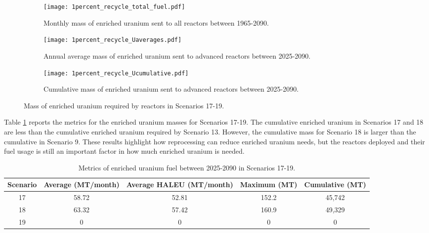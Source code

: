 \begin{figure}[h!]
    \centering
    \begin{subfigure}[b]{0.45\textwidth}
        \centering
        \texttt{[image: 1percent\_recycle\_total\_fuel.pdf]}
        \caption{Monthly mass of enriched uranium sent to all reactors 
        between 1965-2090.}
        \label{fig:1percent_recycle_all_uranium}
    \end{subfigure}
    \hfill
    \begin{subfigure}[b]{0.45\textwidth}
        \centering
        \texttt{[image: 1percent\_recycle\_Uaverages.pdf]}
        \caption{Annual average mass of enriched uranium sent to 
        advanced reactors between 2025-2090.}
        \label{fig:1percent_recycle_AR_uranium}
    \end{subfigure}
    \begin{subfigure}[b]{0.45\textwidth}
        \centering
        \texttt{[image: 1percent\_recycle\_Ucumulative.pdf]}
        \caption{Cumulative mass of enriched 
        uranium sent to advanced reactors between 2025-2090.}
        \label{fig:1percent_recycle_uranium_cumulative}
    \end{subfigure}
       \caption{Mass of enriched uranium required by reactors
        in Scenarios 17-19.}
       \label{fig:1percent_recycle_uranium}
\end{figure}

Table \ref{tab:s17-19_enrichedU} reports the metrics for the enriched 
uranium masses for Scenarios 17-19. The cumulative enriched 
uranium in Scenarios 17 and 18 are less than the cumulative 
enriched uranium required by Scenario 13. However, the cumulative 
mass for Scenario 18 is larger than the cumulative in Scenario 
9. These results highlight how reprocessing can reduce enriched 
uranium needs, but the reactors deployed and their fuel usage 
is still an important factor in how much enriched uranium is 
needed. 

\begin{table}[h!]
    \centering 
    \caption{Metrics of enriched uranium fuel between 2025-2090 in Scenarios 
    17-19.}
    \label{tab:s17-19_enrichedU}
    \begin{tabular}{c c c c c}
        \hline 
        Scenario & Average (MT/month) & Average HALEU (MT/month) &  
        Maximum (MT) & Cumulative (MT) \\
        \hline
        17 & 58.72 & 52.81 & 152.2 & 45,742\\
        18 & 63.32 & 57.42 & 160.9 & 49,329\\
        19 & 0 & 0 & 0 & 0\\
        \hline
    \end{tabular}
\end{table}

